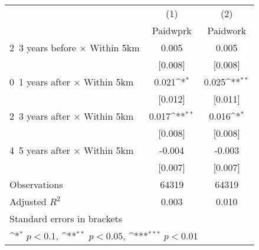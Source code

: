 {
\def\sym#1{\ifmmode^{#1}\else\(^{#1}\)\fi}
\begin{tabular}{l*{2}{c}}
\hline\hline
                    &\multicolumn{1}{c}{(1)}&\multicolumn{1}{c}{(2)}\\
                    &\multicolumn{1}{c}{Paidwprk}&\multicolumn{1}{c}{Paidwork}\\
\hline
2~3 years before × Within 5km&       0.005         &       0.005         \\
                    &     [0.008]         &     [0.008]         \\
0~1 years after × Within 5km&       0.021\sym{*}  &       0.025\sym{**} \\
                    &     [0.012]         &     [0.011]         \\
2~3 years after × Within 5km&       0.017\sym{**} &       0.016\sym{*}  \\
                    &     [0.008]         &     [0.008]         \\
4~5 years after × Within 5km&      -0.004         &      -0.003         \\
                    &     [0.007]         &     [0.007]         \\
\hline
Observations        &       64319         &       64319         \\
Adjusted \(R^{2}\)  &       0.003         &       0.010         \\
\hline\hline
\multicolumn{3}{l}{\footnotesize Standard errors in brackets}\\
\multicolumn{3}{l}{\footnotesize \sym{*} \(p<0.1\), \sym{**} \(p<0.05\), \sym{***} \(p<0.01\)}\\
\end{tabular}
}
